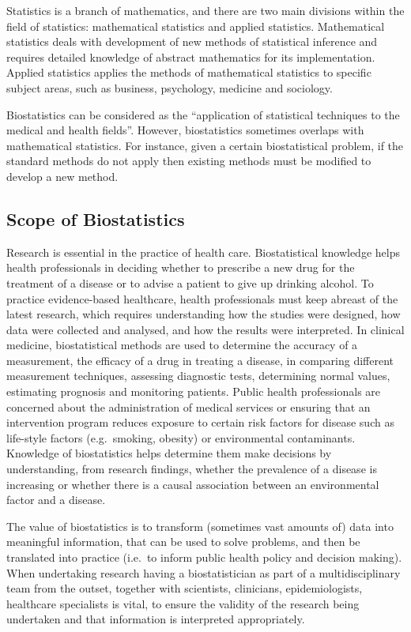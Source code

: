 \documentclass[
  a4paper,
]{memoir}
\begin{document}
Statistics is a branch of mathematics, and there are two main divisions
within the field of statistics: mathematical statistics and applied
statistics. Mathematical statistics deals with development of new
methods of statistical inference and requires detailed knowledge of
abstract mathematics for its implementation. Applied statistics applies
the methods of mathematical statistics to specific subject areas, such
as business, psychology, medicine and sociology.

Biostatistics can be considered as the ``application of statistical
techniques to the medical and health fields''. However, biostatistics
sometimes overlaps with mathematical statistics. For instance, given a
certain biostatistical problem, if the standard methods do not apply
then existing methods must be modified to develop a new method.

\subsection{Scope of Biostatistics}\label{scope-of-biostatistics}

Research is essential in the practice of health care. Biostatistical
knowledge helps health professionals in deciding whether to prescribe a
new drug for the treatment of a disease or to advise a patient to give
up drinking alcohol. To practice evidence-based healthcare, health
professionals must keep abreast of the latest research, which requires
understanding how the studies were designed, how data were collected and
analysed, and how the results were interpreted. In clinical medicine,
biostatistical methods are used to determine the accuracy of a
measurement, the efficacy of a drug in treating a disease, in comparing
different measurement techniques, assessing diagnostic tests,
determining normal values, estimating prognosis and monitoring patients.
Public health professionals are concerned about the administration of
medical services or ensuring that an intervention program reduces
exposure to certain risk factors for disease such as life-style factors
(e.g.~smoking, obesity) or environmental contaminants. Knowledge of
biostatistics helps determine them make decisions by understanding, from
research findings, whether the prevalence of a disease is increasing or
whether there is a causal association between an environmental factor
and a disease.

The value of biostatistics is to transform (sometimes vast amounts of)
data into meaningful information, that can be used to solve problems,
and then be translated into practice (i.e.~to inform public health
policy and decision making). When undertaking research having a
biostatistician as part of a multidisciplinary team from the outset,
together with scientists, clinicians, epidemiologists, healthcare
specialists is vital, to ensure the validity of the research being
undertaken and that information is interpreted appropriately.
\end{document}
